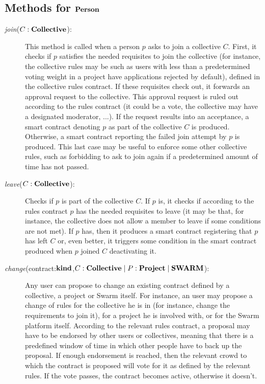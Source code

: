\documentclass[submission, copyright,creativecommons,sharealike,noncommercial]{eptcs}
\begin{document}
	\subsection{Methods for $\textbf{Person}$}
	\renewcommand{\descriptionlabel}[1]{\hspace{\labelsep}{#1}}
	\begin{description}
		\item[\emph{join}($C:\textbf{Collective}$):] This method is called when a person $p$ asks to join a collective $C$. 
%				
		First, it checks if $p$ satisfies the needed requisites to join the collective (for instance, the collective rules may be such as users with less than a predetermined voting weight in a project have applications rejected by default), defined in the collective rules contract. If these requisites check out, it forwards an approval request to the collective. This approval request is ruled out according to the rules contract (it could be a vote, the collective may have a designated moderator, ...). If the request results into an acceptance, a smart contract denoting $p$ as part of the collective $C$ is produced. Otherwise, a smart contract reporting the failed join attempt by $p$ is produced. This last case may be useful to enforce some other collective rules, such as forbidding to ask to join again if a predetermined amount of time has not passed.
		
		\item[\emph{leave}($C:\textbf{Collective}$):] Checks if $p$ is part of the collective $C$. If $p$ is, it checks if according to the rules contract $p$ has the needed requisites to leave (it may be that, for instance, the collective does not allow a member to leave if some conditions are not met). If $p$ has, then it produces a smart contract registering that $p$ has left $C$ or, even better, it triggers some condition in the smart contract produced when $p$ joined $C$ deactivating it.
		
		\item[\emph{change}(contract:$\textbf{kind}$,$C:\textbf{Collective} \mid P:\textbf{Project} \mid \textbf{SWARM}$):] Any user can propose to change an existing contract defined by a collective, a project or Swarm itself. For instance, an user may propose a change of rules for the collective he is in (for instance, change the requirements to join it), for a project he is involved with, or for the Swarm platform itself. According to the relevant rules contract, a proposal may have to be endorsed by other users or collectives, meaning that there is a predefined window of time in which other people have to back up the proposal. If enough endorsement is reached, then the relevant crowd to which the contract is proposed will vote for it as defined by the relevant rules. If the vote passes, the contract becomes active, otherwise it doesn't.
		

\end{description}
\end{document}
